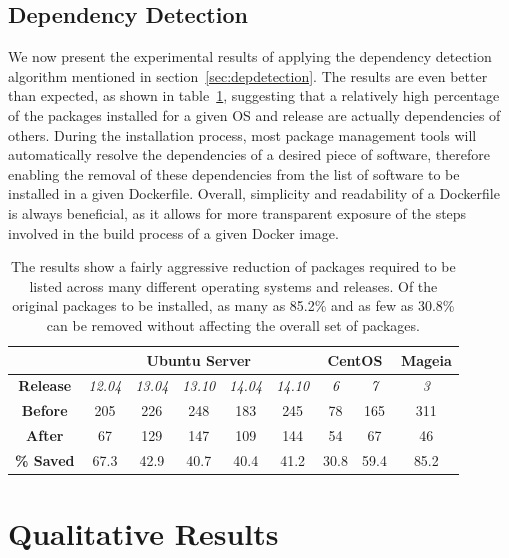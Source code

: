 \subsection{Dependency Detection}
We now present the experimental results of applying the dependency detection algorithm mentioned in section~\ref{sec:depdetection}. The results are even better than expected, as shown in table~\ref{table:culling}, suggesting that a relatively high percentage of the packages installed for a given OS and release are actually dependencies of others. During the installation process, most package management tools will automatically resolve the dependencies of a desired piece of software, therefore enabling the removal of these dependencies from the list of software to be installed in a given Dockerfile. Overall, simplicity and readability of a Dockerfile is always beneficial, as it allows for more transparent exposure of the steps involved in the build process of a given Docker image.

\begin{table}[h]
\centering

    \begin{tabular}{| c | c | c | c | c | c | c | c | c |}
    \hline
& \multicolumn{5}{|c|}{\bfseries Ubuntu Server} & \multicolumn{2}{|c|}{\bfseries CentOS} & \multicolumn{1}{|c|}{\bfseries Mageia} \\ \hline
    \bfseries Release & \itshape 12.04 & \itshape 13.04 & \itshape 13.10 & \itshape 14.04 & \itshape 14.10  & \itshape 6 & \itshape 7 & \itshape 3 \\ \hline
    \bfseries Before & 205 & 226 & 248 & 183 & 245 & 78 & 165 & 311\\ \hline
    \bfseries After & 67 & 129 & 147 & 109 & 144 & 54 & 67 & 46   \\ \hline \hline
    \bfseries \% Saved & 67.3 & 42.9 & 40.7 & 40.4 & 41.2 & 30.8 & 59.4 & 85.2\\
    \hline
    \end{tabular}
\caption{The results show a fairly aggressive reduction of packages required to be listed across many different operating systems and releases. Of the original packages to be installed, as many as 85.2\% and as few as 30.8\% can be removed without affecting the overall set of packages.}
\label{table:culling}
\end{table}

\section{Qualitative Results}
\label{sec:evalqual}

